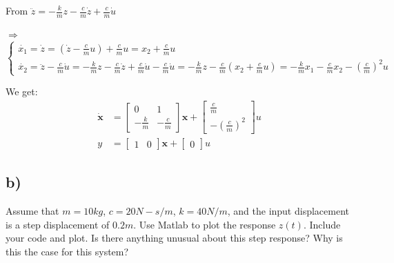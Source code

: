 From $\ddot{z} = -\frac{k}{m}z-\frac{c}{m}\dot{z}+\frac{c}{m}\dot{u}$ 

$\Rightarrow$     
$\left\{
    \begin{array}{lr}
    \dot{x_1} = \dot{z} = \left(\dot{z} - \frac{c}{m}u\right) +  \frac{c}{m}u = x_2 + \frac{c}{m}u\\
    \dot{x_2} = \ddot{z} - \frac{c}{m}\dot{u} = -\frac{k}{m}z-\frac{c}{m}\dot{z}+\frac{c}{m}\dot{u} - \frac{c}{m}\dot{u} = -\frac{k}{m}z - \frac{c}{m}(x_2 + \frac{c}{m}u) = -\frac{k}{m}x_1 - \frac{c}{m}x_2 - \left(\frac{c}{m}\right)^2u
    \end{array}
\right.$ 

We get: 
\begin{equation}
    \begin{aligned}
        \dot{\textbf{x}} &=
        \begin{bmatrix}
            0 & 1 \\
            -\frac{k}{m} & -\frac{c}{m}
        \end{bmatrix}
        \textbf{x} + 
        \begin{bmatrix}
            \frac{c}{m}\\
            -\left(\frac{c}{m}\right)^2
        \end{bmatrix}
        u
        \\
        y &=
        \begin{bmatrix}
            1 & 0
        \end{bmatrix}
        \textbf{x} + 
        \begin{bmatrix}
            0
        \end{bmatrix}
        u
    \end{aligned}
\end{equation}
\subsection{b)}
Assume that $m =10 kg$, $c =20 N-s/m$, $k =40 N/m$, and the input displacement is a step displacement of $0.2 m$. Use Matlab to plot the response $z(t)$. Include your code and plot. Is there anything unusual about this step response? Why is this the case for this system?

